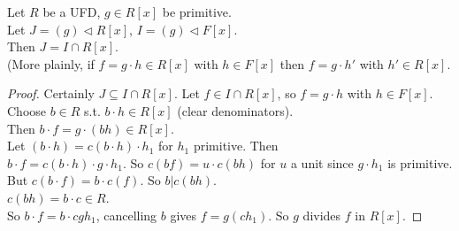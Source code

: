 \documentclass[a4paper]{article}
\begin{document}
\begin{prop}
Let $R$ be a UFD, $g\in R[x]$ be primitive.\\
Let $J=\left(g\right)\triangleleft R[x]$, $I=\left(g\right)\triangleleft F[x]$.\\
Then $J=I \cap R[x]$.\\
(More plainly, if $f=g\cdot h\in R[x]$ with $h\in F[x]$ then $f=g\cdot h'$ with $h' \in R[x]$.
\begin{proof}
Certainly $J \subseteq I \cap R[x]$. Let $f\in I \cap R[x]$, so $f=g\cdot h$ with $h\in F[x]$. Choose $b\in R$ s.t. $b\cdot h\in R[x]$ (clear denominators).\\
Then $b\cdot f=g\cdot \left(bh\right)\in R[x]$.\\
Let $\left(b\cdot h\right)=c\left(b\cdot h\right)\cdot h_1$ for $h_1$ primitive. Then\\
$b\cdot f = c\left(b\cdot h\right)\cdot g\cdot h_1$. So $c\left(bf\right)=u\cdot c\left(bh\right)$ for $u$ a unit since $g\cdot h_1$ is primitive.\\
But $c\left(b\cdot f\right)=b\cdot c\left(f\right)$. So $b|c\left(bh\right)$.\\
$c\left(bh\right)=b\cdot c\in R$.\\
So $b\cdot f=b\cdot c gh_1$, cancelling $b$ gives $f=g\left(ch_1\right)$. So $g$ divides $f$ in $R[x]$.
\end{proof}
\end{prop}
\end{document}
